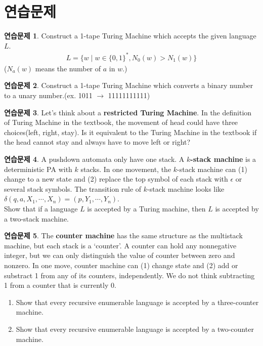 \documentclass[b5paper]{book}
\theoremstyle{definition}
\newtheorem{ec}{연습문제}[chapter]
\begin{document}
\section{연습문제}
\begin{ec}
    Construct a 1-tape Turing Machine which accepts the given language $L$.
    \begin{align*}
        L = \{w \;\vert\; w \in \{0,1\}^*, N_0(w) > N_1(w) \}
    \end{align*}
    ($N_a(w)$ means the number of $a$ in $w$.)
\end{ec}
\begin{ec}
    Construct a 1-tape Turing Machine which converts a binary number to 
    a unary number.(ex. 1011 $\rightarrow$ 11111111111)
\end{ec}
\begin{ec}
    Let's think about a \textbf{restricted Turing Machine}. 
    In the definition of Turing Machine in the textbook, 
    the movement of head could have three choices(left, right, stay). 
    Is it equivalent to the Turing Machine in the textbook if the head 
    cannot stay and always have to move left or right?
\end{ec}
\begin{ec}
    A pushdown automata only have one stack. A \textbf{$k$-stack machine} is 
    a deterministic PA with $k$ stacks. In one movement, the $k$-stack machine 
    can (1) change to a new state and (2) replace the top symbol of each stack
     with $\epsilon$ or several stack symbols. The transition rule of $k$-stack
      machine looks like $\delta(q, a, X_1, \cdots, X_n) = (p, Y_1, \cdots, Y_n)$.
    \\
    Show that if a language $L$ is accepted by a Turing machine, then $L$ is
     accepted by a two-stack machine.
\end{ec}
\begin{ec}
    The \textbf{counter machine} has the same structure as the multistack machine, 
    but each stack is a `counter'. A counter can hold any nonnegative integer, but 
    we can only distinguish the value of counter between zero and nonzero. In one
     move, counter machine can (1) change state and (2) add or substract 1 from any
      of its counters, independently. We do not think subtracting 1 from a counter 
      that is currently 0. 
      \begin{enumerate}
        \item Show that every recursive enumerable language is accepted by 
        a three-counter machine.
        \item Show that every recursive enumerable language is accepted by 
        a two-counter machine.
      \end{enumerate}
\end{ec}
\end{document}
